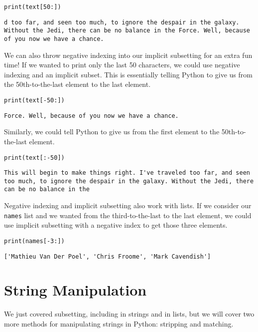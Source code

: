\begin{lstlisting}[style=pippython]
print(text[50:])
\end{lstlisting}
\begin{lstlisting}[style=none]
d too far, and seen too much, to ignore the despair in the galaxy. Without the Jedi, there can be no balance in the Force. Well, because of you now we have a chance.
\end{lstlisting}
We can also throw negative indexing into our implicit subsetting for an extra fun time! If we wanted to print only the last 50 characters, we could use negative indexing and an implicit subset. This is essentially telling Python to give us from the 50th-to-the-last element to the last element.
\begin{lstlisting}[style=pippython]
print(text[-50:])
\end{lstlisting}
\begin{lstlisting}[style=none]
 Force. Well, because of you now we have a chance.
\end{lstlisting}
Similarly, we could tell Python to give us from the first element to the 50th-to-the-last element.
\begin{lstlisting}[style=pippython]
print(text[:-50])
\end{lstlisting}
\begin{lstlisting}[style=none]
This will begin to make things right. I've traveled too far, and seen too much, to ignore the despair in the galaxy. Without the Jedi, there can be no balance in the
\end{lstlisting}
Negative indexing and implicit subsetting also work with lists. If we consider our \verb|names| list and we wanted from the third-to-the-last to the last element, we could use implicit subsetting with a negative index to get those three elements.
\begin{lstlisting}[style=pippython]
print(names[-3:])
\end{lstlisting}
\begin{lstlisting}[style=none]
['Mathieu Van Der Poel', 'Chris Froome', 'Mark Cavendish']
\end{lstlisting}

\section{String Manipulation}
We just covered subsetting, including in strings and in lists, but we will cover two more methods for manipulating strings in Python: stripping and matching.
